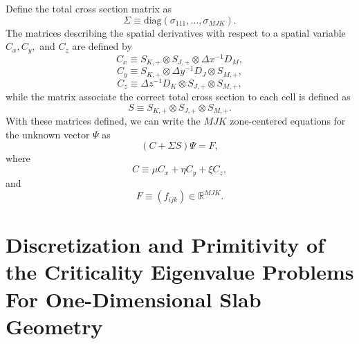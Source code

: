 Define the total cross section matrix as
\begin{equation}
	\Sigma \equiv \text{diag}(\sigma_{111}, \dots, \sigma_{MJK}).
\end{equation}
The matrices describing the spatial derivatives with respect to a spatial variable $C_{x}, C_{y},$ and $C_{z}$ are defined by
\begin{equation}
	C_{x} \equiv S_{K,+} \otimes S_{J,+} \otimes \Delta x^{-1} D_{M},
\end{equation}
\begin{equation}
	C_{y} \equiv S_{K,+} \otimes \Delta y^{-1} D_{J} \otimes S_{M,+},
\end{equation}
\begin{equation}
	C_{z} \equiv \Delta z^{-1} D_{K} \otimes S_{J,+} \otimes S_{M,+},
\end{equation}
while the matrix associate the correct total cross section to each cell is defined as
\begin{equation}
	S \equiv S_{K,+} \otimes S_{J,+} \otimes S_{M,+}.
\end{equation}
With these matrices defined, we can write the $MJK$ zone-centered equations for the unknown vector $\Psi$ as
\begin{equation}
	(C + \Sigma S) \Psi = F,
\end{equation}
where
\begin{equation}
	C \equiv \mu C_{x} + \eta C_{y} + \xi C_{z},
\end{equation}
and 
\begin{equation}
F \equiv (f_{ijk}) \in \mathbb{R}^{MJK}.
\end{equation}


%

\section{Discretization and Primitivity of the Criticality Eigenvalue Problems For One-Dimensional Slab Geometry}

\label{Discrete}


